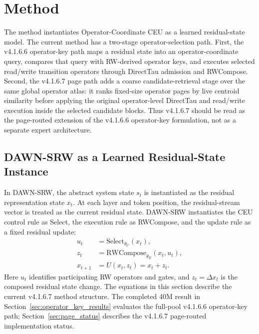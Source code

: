 \documentclass{article}
\begin{document}
\section{Method}
\label{sec:method}

The method instantiates Operator-Coordinate CEU as a learned residual-state model. The current method has a two-stage operator-selection path. First, the v4.1.6.6 operator-key path maps a residual state into an operator-coordinate query, compares that query with RW-derived operator keys, and executes selected read/write transition operators through DirectTau admission and RWCompose. Second, the v4.1.6.7 page path adds a coarse candidate-retrieval stage over the same global operator atlas: it ranks fixed-size operator pages by live centroid similarity before applying the original operator-level DirectTau and read/write execution inside the selected candidate blocks. Thus v4.1.6.7 should be read as the page-routed extension of the v4.1.6.6 operator-key formulation, not as a separate expert architecture.

\subsection{DAWN-SRW as a Learned Residual-State Instance}

In DAWN-SRW, the abstract system state \(s_t\) is instantiated as the residual representation state \(x_t\). At each layer and token position, the residual-stream vector is treated as the current residual state. DAWN-SRW instantiates the CEU control rule as Select, the execution rule as RWCompose, and the update rule as a fixed residual update:
\begin{align}
    u_t &= \mathrm{Select}_{\theta_C}(x_t), \\
    z_t &= \mathrm{RWCompose}_{\theta_E}(x_t,u_t), \\
    x_{t+1} &= U(x_t,z_t)=x_t+z_t .
\end{align}
Here \(u_t\) identifies participating RW operators and gates, and \(z_t=\Delta x_t\) is the composed residual state change. The equations in this section describe the current v4.1.6.7 method structure. The completed 40M result in Section~\ref{sec:operator_key_results} evaluates the full-pool v4.1.6.6 operator-key path; Section~\ref{sec:page_status} describes the v4.1.6.7 page-routed implementation status.
\end{document}
